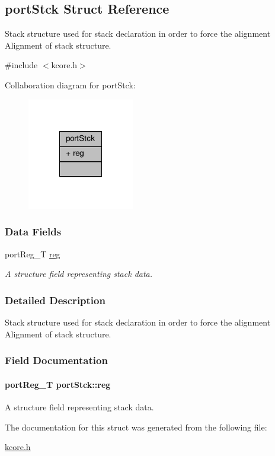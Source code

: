 \hypertarget{structportStck}{\subsection{port\-Stck Struct Reference}
\label{structportStck}
}


Stack structure used for stack declaration in order to force the alignment Alignment of stack structure.  




{\ttfamily \#include $<$kcore.\-h$>$}



Collaboration diagram for port\-Stck\-:\nopagebreak
\begin{figure}[H]
\begin{center}
\leavevmode
\includegraphics[width=132pt]{structportStck__coll__graph}
\end{center}
\end{figure}
\subsubsection*{Data Fields}
\begin{DoxyCompactItemize}
\item 
port\-Reg\-\_\-\-T \hyperlink{structportStck_a52e715773895c635b3e8ddb30d582d9c}{reg}
\begin{DoxyCompactList}\small\item\em A structure field representing stack data. \end{DoxyCompactList}\end{DoxyCompactItemize}


\subsubsection{Detailed Description}
Stack structure used for stack declaration in order to force the alignment Alignment of stack structure. 

\subsubsection{Field Documentation}
\hypertarget{structportStck_a52e715773895c635b3e8ddb30d582d9c}{
\paragraph[{reg}]{\setlength{\rightskip}{0pt plus 5cm}port\-Reg\-\_\-\-T port\-Stck\-::reg}}\label{structportStck_a52e715773895c635b3e8ddb30d582d9c}


A structure field representing stack data. 



The documentation for this struct was generated from the following file\-:\begin{DoxyCompactItemize}
\item 
\hyperlink{kcore_8h}{kcore.\-h}\end{DoxyCompactItemize}
